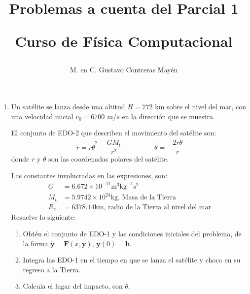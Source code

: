 \documentclass[letterpaper]{article}
\title{Problemas a cuenta del Parcial 1 \\ \begin{large}Curso de Física Computacional\end{large}}
\author{M. en C. Gustavo Contreras Mayén}
\date{ }
\begin{document}
\maketitle
\fontsize{17.28}{17.28}\selectfont
{}
\begin{enumerate}
\item Un satélite se lanza desde una altitud $H=772$ km sobre el nivel del mar, con una velocidad inicial $v_{0}=6700$ $m/s$ en la dirección que se muestra.
\begin{figure}[!h]
\centering
{}
\end{figure}
\par
El conjunto de EDO-2 que describen el movimiento del satélite son:
\[ \ddot{r} = r  \dot{\theta}^{2} - \dfrac{G M_{t}}{r^{2}}  \hspace{2cm} \ddot{\theta} = - \dfrac{2 \dot{r}\dot{\theta}}{r}\]
donde $r$ y $\theta$ son las coordenadas polares del satélite.
\par
Las constantes involucradas en las expresiones, son:
\begin{align*}
G &= 6.672 \times 10^{-11} \mbox{m}^{3} \mbox{kg}^{-1} \mbox{s}^{2} \\
M_{t} &= 5.9742 \times 10^{24} \mbox{kg, Masa de la Tierra} \\
R_{e} &= 6378.14 \mbox{km, radio de la Tierra al nivel del mar} 
\end{align*}
Resuelve lo siguiente:
\begin{enumerate}
\item Obtén el conjunto de EDO-1 y las condiciones iniciales del problema, de la forma $\dot{\mathbf{y}} = \mathbf{F}(x,\mathbf{y})$, $\mathbf{y}(0) = \mathbf{b}$.
\item Integra las EDO-1 en el tiempo en que se lanza el satélite y choca en su regreso a la Tierra.
\item Calcula el lugar del impacto, con $\theta$.
\end{enumerate}
\end{enumerate}
\end{document}
